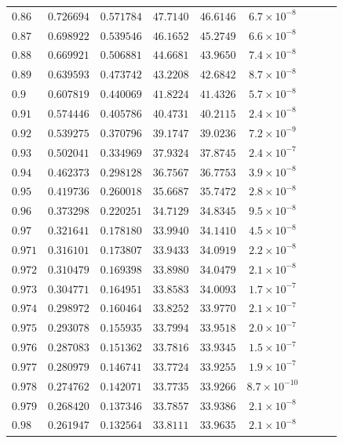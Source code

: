 \documentclass[12pt]{extarticle}
\theoremstyle{plain}
\theoremstyle{remark}
\begin{document}
\begin{longtable}{lcccccccc}
$0.86$ & $0.726694$ & $0.571784$ & $47.7140$ & $46.6146$ & $6.7\times10^{-8}$ \\
$0.87$ & $0.698922$ & $0.539546$ & $46.1652$ & $45.2749$ & $6.6\times10^{-8}$ \\
$0.88$ & $0.669921$ & $0.506881$ & $44.6681$ & $43.9650$ & $7.4\times10^{-8}$ \\
$0.89$ & $0.639593$ & $0.473742$ & $43.2208$ & $42.6842$ & $8.7\times10^{-8}$ \\
$0.9$ & $0.607819$ & $0.440069$ & $41.8224$ & $41.4326$ & $5.7\times10^{-8}$ \\
$0.91$ & $0.574446$ & $0.405786$ & $40.4731$ & $40.2115$ & $2.4\times10^{-8}$ \\
$0.92$ & $0.539275$ & $0.370796$ & $39.1747$ & $39.0236$ & $7.2\times10^{-9}$ \\
$0.93$ & $0.502041$ & $0.334969$ & $37.9324$ & $37.8745$ & $2.4\times10^{-7}$ \\
$0.94$ & $0.462373$ & $0.298128$ & $36.7567$ & $36.7753$ & $3.9\times10^{-8}$ \\
$0.95$ & $0.419736$ & $0.260018$ & $35.6687$ & $35.7472$ & $2.8\times10^{-8}$ \\
$0.96$ & $0.373298$ & $0.220251$ & $34.7129$ & $34.8345$ & $9.5\times10^{-8}$ \\
$0.97$ & $0.321641$ & $0.178180$ & $33.9940$ & $34.1410$ & $4.5\times10^{-8}$ \\
$0.971$ & $0.316101$ & $0.173807$ & $33.9433$ & $34.0919$ & $2.2\times10^{-8}$ \\
$0.972$ & $0.310479$ & $0.169398$ & $33.8980$ & $34.0479$ & $2.1\times10^{-8}$ \\
$0.973$ & $0.304771$ & $0.164951$ & $33.8583$ & $34.0093$ & $1.7\times10^{-7}$ \\
$0.974$ & $0.298972$ & $0.160464$ & $33.8252$ & $33.9770$ & $2.1\times10^{-7}$ \\
$0.975$ & $0.293078$ & $0.155935$ & $33.7994$ & $33.9518$ & $2.0\times10^{-7}$ \\
$0.976$ & $0.287083$ & $0.151362$ & $33.7816$ & $33.9345$ & $1.5\times10^{-7}$ \\
$0.977$ & $0.280979$ & $0.146741$ & $33.7724$ & $33.9255$ & $1.9\times10^{-7}$ \\
$0.978$ & $0.274762$ & $0.142071$ & $33.7735$ & $33.9266$ & $8.7\times10^{-10}$ \\
$0.979$ & $0.268420$ & $0.137346$ & $33.7857$ & $33.9386$ & $2.1\times10^{-8}$ \\
$0.98$ & $0.261947$ & $0.132564$ & $33.8111$ & $33.9635$ & $2.1\times10^{-8}$ \\

\end{longtable}
\end{document}
